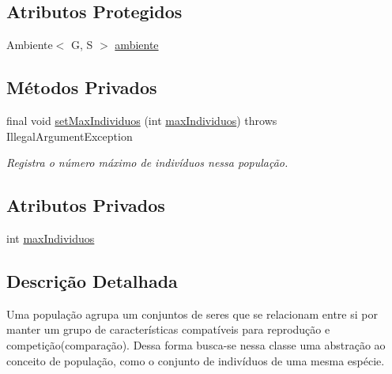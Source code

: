 \subsection*{Atributos Protegidos}
\begin{DoxyCompactItemize}
\item 
Ambiente$<$ G, S $>$ \hyperlink{classic_1_1populacional_1_1_populacao_3_01_g_01extends_01_number_00_01_s_01extends_01_ser_3_01_g_01_4_01_4_a26077a80e3d7cefbedda10fd28425144}{ambiente}
\end{DoxyCompactItemize}
\subsection*{Métodos Privados}
\begin{DoxyCompactItemize}
\item 
final void \hyperlink{classic_1_1populacional_1_1_populacao_3_01_g_01extends_01_number_00_01_s_01extends_01_ser_3_01_g_01_4_01_4_a45859505509c01118d775f3198dc2b8a}{set\-Max\-Individuos} (int \hyperlink{classic_1_1populacional_1_1_populacao_3_01_g_01extends_01_number_00_01_s_01extends_01_ser_3_01_g_01_4_01_4_a45ee056bf518cbc3714bfc29d0efa2b0}{max\-Individuos})  throws Illegal\-Argument\-Exception 
\begin{DoxyCompactList}\small\item\em Registra o número máximo de indivíduos nessa população. \end{DoxyCompactList}\end{DoxyCompactItemize}
\subsection*{Atributos Privados}
\begin{DoxyCompactItemize}
\item 
int \hyperlink{classic_1_1populacional_1_1_populacao_3_01_g_01extends_01_number_00_01_s_01extends_01_ser_3_01_g_01_4_01_4_a45ee056bf518cbc3714bfc29d0efa2b0}{max\-Individuos}
\end{DoxyCompactItemize}


\subsection{Descrição Detalhada}
Uma {\ttfamily população} agrupa um conjuntos de {\ttfamily seres} que se relacionam entre si por manter um grupo de características compatíveis para reprodução e competição(comparação). Dessa forma busca-\/se nessa classe uma abstração ao conceito de população, como o conjunto de indivíduos de uma mesma espécie. 

